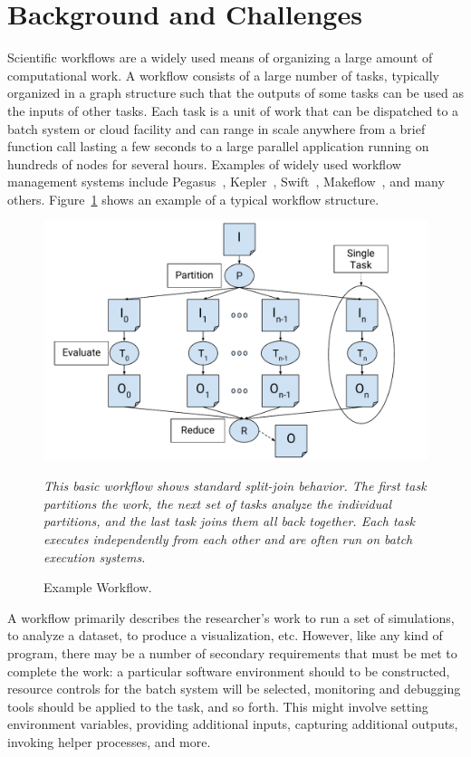\documentclass[conference]{IEEEtran}
\begin{document}
\section{Background and Challenges}

Scientific workflows are a widely used means of organizing
a large amount of computational work.  A workflow consists
of a large number of tasks, typically organized in a graph structure
such that the outputs of some tasks can be used as the inputs 
of other tasks.  Each task is a unit of work that can be dispatched
to a batch system or cloud facility and can range in scale anywhere
from a brief function call lasting a few seconds to a large parallel
application running on hundreds of nodes for several hours.
Examples of widely used workflow management systems include
Pegasus~\cite{pegasus}, 
Kepler~\cite{doi:10.1002-cpe.94}, 
Swift~\cite{swift}, 
Makeflow~\cite{makeflow-sweet12}, and many others. Figure~\ref{fig:workflow} shows an example of a typical
workflow structure.

\begin{figure}[t]
\includegraphics[width=\columnwidth]{graphics/example_workflow.pdf}
\caption{Example Workflow.}
\small
\emph{This basic workflow shows
standard split-join behavior. The first task partitions the work, the next set of tasks analyze the individual 
partitions, and the last task joins them all back 
together. Each task executes independently from each other
and are often run on batch execution systems.}
\label{fig:workflow}
\end{figure}


A workflow primarily describes the researcher's work
to run a set of simulations, 
to analyze a dataset, 
to produce a visualization, etc.
However, like any kind of program, there may be a number of secondary
requirements that must be met to complete the work:
a particular software environment should to be constructed,
resource controls for the batch system will be selected,
monitoring and debugging tools should be applied to the task,
and so forth.  This might involve  
setting environment variables,
providing additional inputs, capturing additional outputs,
invoking helper processes, and more.
\end{document}
